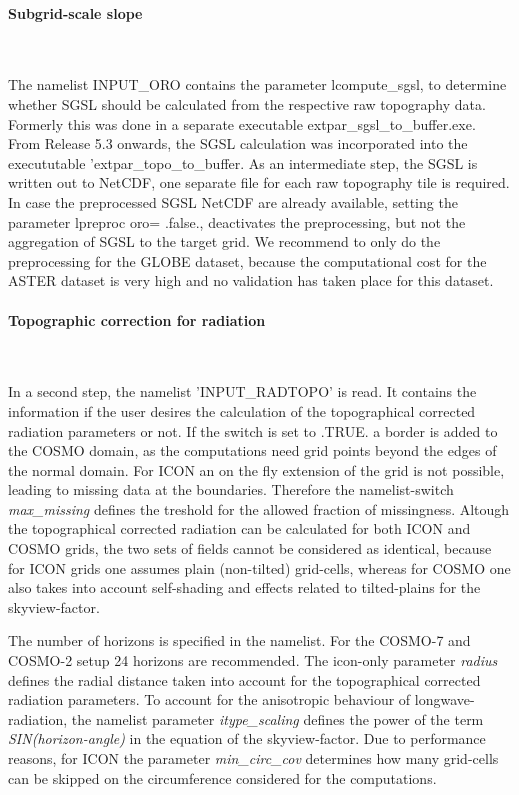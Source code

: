 \documentclass[a4paper,10pt,DIV14,BCOR1cm,titlepage,twoside]{scrartcl}
\begin{document}
\paragraph{Subgrid-scale slope}\ \par\medskip\noindent
The namelist INPUT\_ORO contains the parameter lcompute\_sgsl, to determine whether SGSL should be calculated from the respective raw topography data. Formerly this was done in a separate executable extpar\_sgsl\_to\_buffer.exe. From Release 5.3 onwards, the SGSL calculation was incorporated into the execututable 'extpar\_topo\_to\_buffer. As an intermediate step, the SGSL is written out to NetCDF, one separate file for each raw topography tile is required. In case the preprocessed SGSL NetCDF are already available, setting the parameter lpreproc oro= .false., deactivates the preprocessing, but not the aggregation of SGSL to the target grid. We recommend to only do the preprocessing for the GLOBE dataset, because the computational cost for the ASTER dataset is very high and no validation has taken place for this dataset.
\paragraph{Topographic correction for radiation}\ \par\medskip\noindent
In a second step, the namelist 'INPUT\_RADTOPO' is read. It contains the information if the user desires the calculation of the topographical corrected radiation parameters or not.
If the switch is set to .TRUE. a border is added to the COSMO domain, as the computations need grid points beyond the edges of the normal domain. For ICON an on the fly extension of the grid is not possible, leading to missing data at the boundaries. Therefore the namelist-switch \textit{max\_missing} defines the treshold for the allowed fraction of missingness.
Altough the topographical corrected radiation can be calculated for both ICON and COSMO grids, the two sets of fields cannot be considered as identical, because for ICON grids one assumes plain (non-tilted) grid-cells, whereas for COSMO one also takes into account self-shading and effects related to tilted-plains for the skyview-factor. 

The number of horizons is specified in the namelist. For the COSMO-7 and COSMO-2 setup 24 horizons are recommended. The icon-only parameter \textit{radius} defines the radial distance taken into account for the topographical corrected radiation parameters. 
To account for the anisotropic behaviour of longwave-radiation, the namelist parameter \textit{itype\_scaling} defines the power of the term \textit{SIN(horizon-angle)} in the equation of the skyview-factor.
Due to performance reasons, for ICON the parameter \textit{min\_circ\_cov}  determines how many grid-cells can be skipped on the circumference considered for the computations.\par\medskip\noindent
\end{document}

